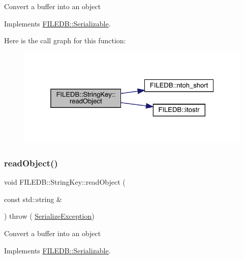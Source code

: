 Convert a buffer into an object 

Implements \mbox{\hyperlink{classFILEDB_1_1Serializable_a21a5831fa4f65790490a8a5eba9fcab2}{F\+I\+L\+E\+D\+B\+::\+Serializable}}.

Here is the call graph for this function\+:
\nopagebreak
\begin{figure}[H]
\begin{center}
\leavevmode
\includegraphics[width=325pt]{d2/da7/classFILEDB_1_1StringKey_a25cefb184c88bc5bf871245e82ea21f9_cgraph}
\end{center}
\end{figure}
\mbox{\label{classFILEDB_1_1StringKey_a25cefb184c88bc5bf871245e82ea21f9}} 
\subsubsection{\texorpdfstring{readObject()}{readObject()}\hspace{0.1cm}{\footnotesize\ttfamily [2/3]}}
{\footnotesize\ttfamily void F\+I\+L\+E\+D\+B\+::\+String\+Key\+::read\+Object (\begin{DoxyParamCaption}\item[{const std\+::string \&}]{ }\end{DoxyParamCaption}) throw ( \mbox{\hyperlink{classFILEDB_1_1SerializeException}{Serialize\+Exception}}) \hspace{0.3cm}{\ttfamily [virtual]}}

Convert a buffer into an object 

Implements \mbox{\hyperlink{classFILEDB_1_1Serializable_a21a5831fa4f65790490a8a5eba9fcab2}{F\+I\+L\+E\+D\+B\+::\+Serializable}}.

\mbox{\label{classFILEDB_1_1StringKey_a25cefb184c88bc5bf871245e82ea21f9}} 
